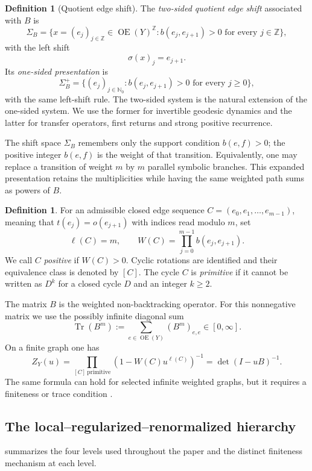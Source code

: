 \documentclass[11pt,reqno]{amsart}
\numberwithin{equation}{section}
\theoremstyle{definition}
\newtheorem{definition}[theorem]{Definition}
\theoremstyle{remark}
\newcommand{\OrE}{\operatorname{OE}}
\newcommand{\Tr}{\operatorname{Tr}}
\begin{document}
\begin{definition}[Quotient edge shift]\label{def:quotient-edge-shift}
The \emph{two-sided quotient edge shift} associated with $B$ is
\[
 \Sigma_B=
 \bigl\{x=(e_j)_{j\in\mathbb Z}\in\OrE(Y)^{\mathbb Z}:
 b(e_j,e_{j+1})>0\text{ for every }j\in\mathbb Z\bigr\},
\]
with the left shift
\[
 \sigma(x)_j=e_{j+1}.
\]
Its \emph{one-sided presentation} is
\[
 \Sigma_B^+=
 \bigl\{(e_j)_{j\in\mathbb N_0}:b(e_j,e_{j+1})>0
 \text{ for every }j\ge0\bigr\},
\]
with the same left-shift rule.  The two-sided system is the natural extension
of the one-sided system.  We use the former for invertible geodesic dynamics
and the latter for transfer operators, first returns and strong positive
recurrence.

The shift space $\Sigma_B$ remembers only the support condition $b(e,f)>0$;
the positive integer $b(e,f)$ is the weight of that transition.  Equivalently,
one may replace a transition of weight $m$ by $m$ parallel symbolic branches.
This expanded presentation retains the multiplicities while having the same
weighted path sums as powers of $B$.
\end{definition}

\begin{definition}\label{def:pathweight}
For an admissible closed edge sequence
$C=(e_0,e_1,\ldots,e_{m-1})$, meaning that
$t(e_j)=o(e_{j+1})$ with indices read modulo $m$, set
\[
 \ell(C)=m,
 \qquad
 W(C)=\prod_{j=0}^{m-1}b(e_j,e_{j+1}).
\]
We call $C$ \emph{positive} if $W(C)>0$.  Cyclic rotations are identified and
their equivalence class is denoted by $[C]$.  The cycle $C$ is
\emph{primitive} if it cannot be written as $D^k$ for a closed cycle $D$ and
an integer $k\ge2$.
\end{definition}

The matrix $B$ is the weighted non-backtracking operator.  For this
nonnegative matrix we use the possibly infinite diagonal
sum
\[
 \Tr(B^m):=\sum_{e\in\OrE(Y)}(B^m)_{e,e}\in[0,\infty].
\]
On a finite graph one has \cite{Bass1992}
\begin{equation}\label{eq:finitezeta}
 Z_Y(u)=\prod_{[C]\ \mathrm{primitive}}
 (1-W(C)u^{\ell(C)})^{-1}
 =\det(I-uB)^{-1}.
\end{equation}
The same formula can hold for selected infinite weighted graphs, but it requires
a finiteness or trace condition \cite{Deitmar2015,DeitmarKang2018}.

\Needspace{0.34\textheight}
\subsection{The local--regularized--renormalized hierarchy}
 summarizes the four levels used throughout the
paper and the distinct finiteness mechanism at each level.
\end{document}
